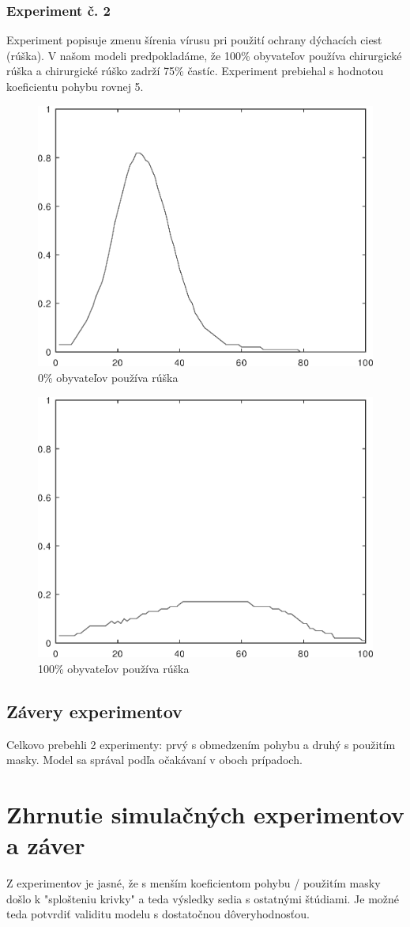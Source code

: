 \documentclass[12pt,a4paper,titlepage]{article}
\begin{document}
\subsubsection{Experiment č. 2}
Experiment popisuje zmenu šírenia vírusu pri použití ochrany dýchacích ciest (rúška). V našom modeli predpokladáme, že 100\% obyvateľov používa chirurgické rúška a chirurgické rúško zadrží 75\% častíc.\cite{Masks}
Experiment prebiehal s hodnotou koeficientu pohybu rovnej 5.

\begin{figure}[h!]
    \center
    \includegraphics[width=.39\linewidth]{movement5transmission0,059.eps}
    \caption{0\% obyvateľov používa rúška}
\end{figure}

\begin{figure}[h!]
    \centering
    \includegraphics[width=.39\linewidth]{movement5transmission0,01475.eps}
    \caption{100\% obyvateľov používa rúška}
\end{figure}

\subsection{Závery experimentov}
Celkovo prebehli 2 experimenty: prvý s obmedzením pohybu a druhý s použitím masky. Model sa správal podľa očakávaní v oboch prípadoch.

\section{Zhrnutie simulačných experimentov a záver}
Z experimentov je jasné, že s menším koeficientom pohybu / použitím masky došlo k "splošteniu krivky" a teda výsledky sedia s ostatnými štúdiami. Je možné teda potvrdiť validitu modelu s dostatočnou dôveryhodnosťou. \cite{Experiment1}

\newpage
\renewcommand{\refname}{Referencie}

\end{document}
